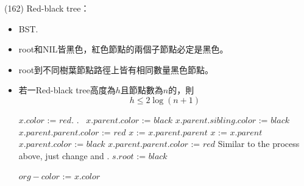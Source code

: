 \item \begin{theorem}{(162)} Red-black tree： \label{rbt}\begin{itemize}
        \item BST.
        \item root和NIL皆黑色，紅色節點的兩個子節點必定是黑色。
        \item root到不同樹葉節點路徑上皆有相同數量黑色節點。
        \item 若一Red-black tree高度為$h$且節點數為$n$的，則\begin{equation}
            h \le 2\log (n + 1)
        \end{equation}
        \begin{algorithm}[H]
            \begin{algorithmic}[1]
                    \State $x.color$ := $red$.
                    \State {}.\
                                \State $x.parent.color$ := $black$
                                \State $x.parent.sibling.color$ := $black$
                                \State $x.parent.parent.color$ := $red$
                                \State $x$ := $x.parent.parent$
                                \State $x$ := $x.parent$
                                \State {}
                            \Else
                                \State $x.parent.color$ := $black$
                                \State $x.parent.parent.color$ := $red$
                                \State {}
                            \EndIf
                        \Else
                            \State Similar to the process above, just change  and .
                        \EndIf
                    \EndWhile
                    \State $s.root$ := $black$
                \EndFunction
            \end{algorithmic}
        \end{algorithm}
        \begin{algorithm}[H]
            \begin{algorithmic}[1]
                    \State $org-color$ := $x.color$

\end{algorithmic}
\end{algorithm}
\end{itemize}
\end{theorem}
